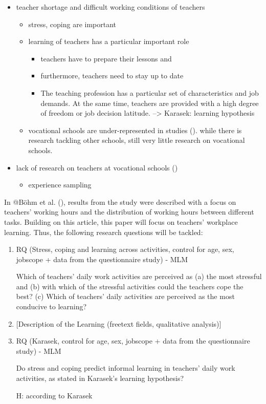 \documentclass[
]{article}
\providecommand{\tightlist}{%
  \setlength{\itemsep}{0pt}\setlength{\parskip}{0pt}}
\begin{document}
\begin{itemize}
\item
  teacher shortage and difficult working conditions of teachers

  \begin{itemize}
  \item
    stress, coping are important
  \item
    learning of teachers has a particular important role

    \begin{itemize}
    \item
      teachers have to prepare their lessons and
    \item
      furthermore, teachers need to stay up to date
    \item
      The teaching profession has a particular set of characteristics
      and job demands. At the same time, teachers are provided with a
      high degree of freedom or job decision latitude. --\textgreater{}
      Karasek: learning hypothesis
    \end{itemize}
  \item
    vocational schools are under-represented in studies (). while there
    is research tackling other schools, still very little research on
    vocational schools.
  \end{itemize}
\item
  lack of research on teachers at vocational schools ()

  \begin{itemize}
  \tightlist
  \item
    experience sampling
  \end{itemize}
\end{itemize}

In @Böhm et al. (),
results from the study were described with a focus on teachers' working
hours and the distribution of working hours between different tasks.
Building on this article, this paper will focus on teachers' workplace
learning. Thus, the following research questions will be tackled:

\begin{enumerate}
\def\labelenumi{\arabic{enumi}.}
\item
  RQ (Stress, coping and learning across activities, control for age,
  sex, jobscope + data from the questionnaire study) - MLM

  Which of teachers' daily work activities are perceived as (a) the most
  stressful and (b) with which of the stressful activities could the
  teachers cope the best? (c) Which of teachers' daily activities are
  perceived as the most conducive to learning?
\item
  {[}Description of the Learning (freetext fields, qualitative
  analysis){]}
\item
  RQ (Karasek, control for age, sex, jobscope + data from the
  questionnaire study) - MLM

  Do stress and coping predict informal learning in teachers' daily work
  activities, as stated in Karasek's learning hypothesis?

  H: according to Karasek
\end{enumerate}
\end{document}
